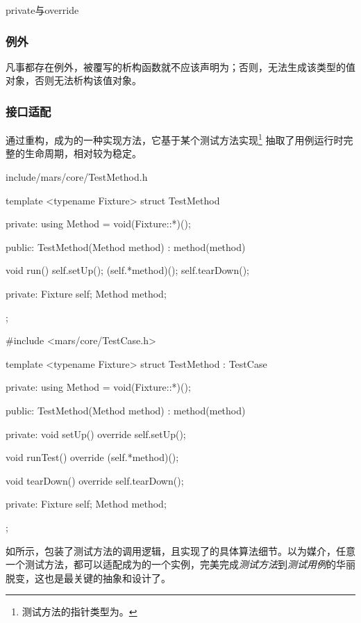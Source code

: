\begin{content}
\begin{episode}{private与override}
\begin{content}
\subsubsection{例外}

凡事都存在例外，被覆写的析构函数就不应该声明为；否则，无法生成该类型的值对象，否则无法析构该值对象。

\end{content}
\end{episode}

\subsubsection{接口适配}

通过重构，成为的一种实现方法，它基于某个测试方法实现\footnote{测试方法的指针类型为。} 抽取了用例运行时完整的生命周期，相对较为稳定。

\begin{diff}{include/mars/core/TestMethod.h}
 \begin{minicpp}
template <typename Fixture>
struct TestMethod {
private:
  using Method = void(Fixture::*)();

public:
  TestMethod(Method method)
    : method(method) {}

  void run() {
    self.setUp();
    (self.*method)();
    self.tearDown();
  }

private:
  Fixture self;
  Method method;
};
  \end{minicpp}
\tcblower
 \begin{minicpp}
#include <mars/core/TestCase.h>

template <typename Fixture>
struct TestMethod : TestCase {
private:
  using Method = void(Fixture::*)();

public:
  TestMethod(Method method)
    : method(method) {}

private:
  void setUp() override {
    self.setUp();
  }

  void runTest() override {
    (self.*method)();
  }

  void tearDown() override {
    self.tearDown();
  }

private:
  Fixture self;
  Method method;
};
  \end{minicpp}
\end{diff}

如所示，包装了测试方法的调用逻辑，且实现了的具体算法细节。以为媒介，任意一个测试方法，都可以适配成为的一个实例，完美完成\emph{测试方法}到\emph{测试用例}的华丽脱变，这也是最关键的抽象和设计了。


\end{content}
